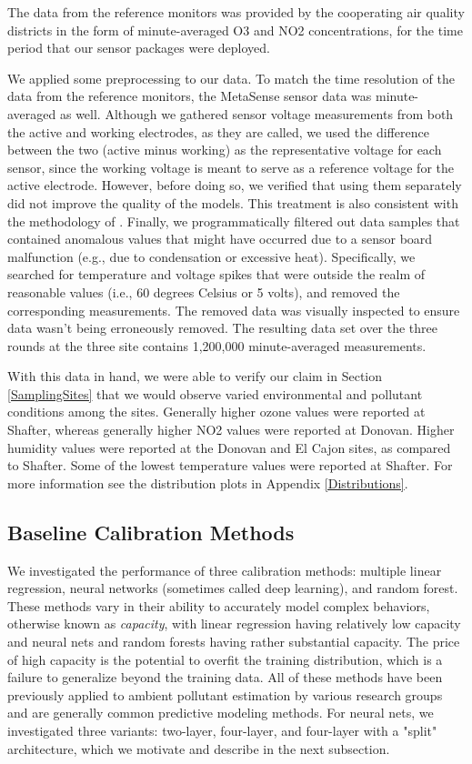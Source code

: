 \documentclass[journal abbreviation, manuscript]{copernicus}
\begin{document}
The data from the reference monitors was provided by the cooperating air quality districts in the form of minute-averaged O3 and NO2 concentrations, for the time period that our sensor packages were deployed.

We applied some preprocessing to our data.  To match the time resolution of the data from the reference monitors, the MetaSense sensor data was minute-averaged as well.  Although we gathered sensor voltage measurements from both the active and working electrodes, as they are called, we used the difference between the two (active minus working) as the representative voltage for each sensor, since the working voltage is meant to serve as a reference voltage for the active electrode.  However, before doing so, we verified that using them separately did not improve the quality of the models.  This treatment is also consistent with the methodology of \citet{Zimmerman2018}.  Finally, we programmatically filtered out data samples that contained anomalous values that might have occurred due to a sensor board malfunction (e.g., due to condensation or excessive heat).  Specifically, we searched for temperature and voltage spikes that were outside the realm of reasonable values (i.e., 60 degrees Celsius or 5 volts), and removed the corresponding measurements.  The removed data was visually inspected to ensure data wasn't being erroneously removed.  The resulting data set over the three rounds at the three site contains 1,200,000 minute-averaged measurements.

With this data in hand, we were able to verify our claim in Section \ref{SamplingSites} that we would observe varied environmental and pollutant conditions among the sites. Generally higher ozone values were reported at Shafter, whereas generally higher NO2 values were reported at Donovan.  Higher humidity values were reported at the Donovan and El Cajon sites, as compared to Shafter.  Some of the lowest temperature values were reported at Shafter.  For more information see the distribution plots in Appendix \ref{Distributions}. 

\subsection{Baseline Calibration Methods}\label{sec:calibration-methods}
We investigated the performance of three calibration methods: multiple linear regression, neural networks (sometimes called deep learning), and random forest.  These methods vary in their ability to accurately model complex behaviors, otherwise known as \textit{capacity}, with linear regression having relatively low capacity and neural nets and random forests having rather substantial capacity.  The price of high capacity is the potential to overfit the training distribution, which is a failure to generalize beyond the training data.  All of these methods have been previously applied to ambient pollutant estimation by various research groups \cite{Piedrahita2014,Spinelle2015,SPINELLE2017706,Sadighi2018,Zimmerman2018,Casey2018testing} and are generally common predictive modeling methods.  For neural nets, we investigated three variants: two-layer, four-layer, and four-layer with a "split" architecture, which we motivate and describe in the next subsection.
\end{document}
